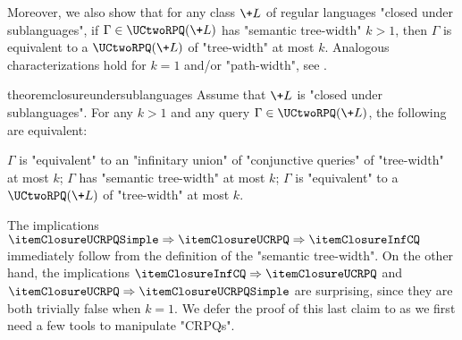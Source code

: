 
Moreover, we also show that for any class $\+L$ of regular languages "closed under sublanguages", if $\Gamma \in \UCtwoRPQ(\+L)$ has "semantic tree-width" $k > 1$,
then $\Gamma$ is equivalent to a $\UCtwoRPQ(\+L)$ of "tree-width" at most $k$.
Analogous characterizations hold for $k=1$ and/or "path-width", see .

\begin{restatable*}{theorem}{closureundersublanguages}
    \AP\label{thm:closure-under-sublanguages}
    \AP Assume that $\+L$ is "closed under sublanguages". 
    For any $k > 1$ and any query $\Gamma \in \UCtwoRPQ(\+L)$, the following are equivalent:
    \begin{enumerate}
        \itemAP[\introinrestatable{\itemClosureInfCQ}] $\Gamma$ is "equivalent" to an "infinitary union" of "conjunctive queries"
            of "tree-width" at most $k$; \label{thm:closure-under-sublanguages:1}
        \itemAP[\introinrestatable{\itemClosureUCRPQ}] $\Gamma$ has "semantic tree-width" at most $k$; \label{thm:closure-under-sublanguages:2}
        \itemAP[\introinrestatable{\itemClosureUCRPQSimple}] $\Gamma$ is "equivalent" to a $\UCtwoRPQ(\+L)$ of "tree-width" at most $k$. \label{thm:closure-under-sublanguages:3}
    \end{enumerate}
\end{restatable*}

The implications $\itemClosureUCRPQSimple \Rightarrow \itemClosureUCRPQ \Rightarrow \itemClosureInfCQ$ immediately follow
from the definition of the "semantic tree-width".
On the other hand, the
implications $\itemClosureInfCQ \Rightarrow \itemClosureUCRPQ$ and $\itemClosureUCRPQ \Rightarrow \itemClosureUCRPQSimple$ are surprising,
since they are both trivially false when $k=1$. We defer the proof of this last claim
to  as we first need a few tools to manipulate "CRPQs".

